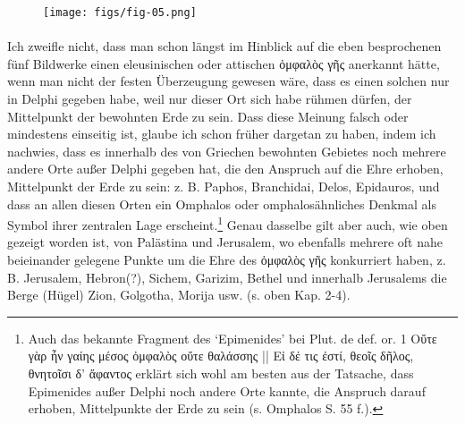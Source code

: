 \documentclass[a4paper, 11pt, oneside]{article}
\begin{document}
\begin{figure}[H]
\centering
\texttt{[image: figs/fig-05.png]}
\caption{}
\end{figure}
\paragraph{}
Ich zweifle nicht, dass man schon längst im Hinblick auf die eben besprochenen fünf Bildwerke einen eleusinischen oder attischen ὀμφαλὸς γῆς anerkannt hätte, wenn man nicht der festen Überzeugung gewesen wäre, dass es einen solchen nur in Delphi gegeben habe, weil nur dieser Ort sich habe rühmen dürfen, der Mittelpunkt der bewohnten Erde zu sein. Dass diese Meinung falsch oder mindestens einseitig ist, glaube ich schon früher dargetan zu haben, indem ich nachwies, dass es innerhalb des von Griechen bewohnten Gebietes noch mehrere andere Orte außer Delphi gegeben hat, die den Anspruch auf die Ehre erhoben, Mittelpunkt der Erde zu sein: z. B. Paphos, Branchidai, Delos, Epidauros, und dass an allen diesen Orten ein Omphalos oder omphalosähnliches Denkmal als Symbol ihrer zentralen Lage erscheint.\footnote{Auch das bekannte Fragment des `Epimenides' bei Plut. de def. or. 1 Οὔτε γὰρ ἦν γαίης μέσος ὀμφαλὸς οὔτε θαλάσσης || Εἰ δέ τις ἐστί, θεοῖς δῆλος, θνητοῖσι δ' ἄφαντος erklärt sich wohl am besten aus der Tatsache, dass Epimenides außer Delphi noch andere Orte kannte, die Anspruch darauf erhoben, Mittelpunkte der Erde zu sein (s. Omphalos S. 55 f.).} Genau dasselbe gilt aber auch, wie oben gezeigt worden ist, von Palästina und Jerusalem, wo ebenfalls mehrere oft nahe beieinander gelegene Punkte um die Ehre des ὀμφαλὸς γῆς konkurriert haben, z. B. Jerusalem, Hebron(?), Sichem, Garizim, Bethel und innerhalb Jerusalems die Berge (Hügel) Zion, Golgotha, Morija usw. (s. oben Kap. 2-4).
\end{document}
